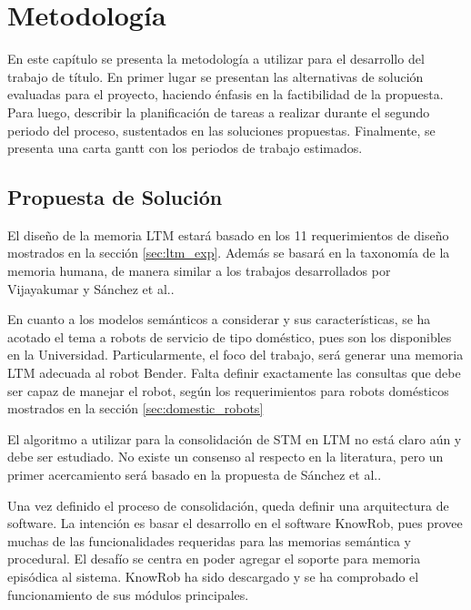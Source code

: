 
\chapter{Metodología}

En este capítulo se presenta la metodología a utilizar para el desarrollo del trabajo de título. En primer lugar se presentan las alternativas de solución evaluadas para el proyecto, haciendo énfasis en la factibilidad de la propuesta. Para luego, describir la planificación de tareas a realizar durante el segundo periodo del proceso, sustentados en las soluciones propuestas. Finalmente, se presenta una carta gantt con los periodos de trabajo estimados.


\section{Propuesta de Solución}

%


El diseño de la memoria LTM estará basado en los 11 requerimientos de diseño mostrados en la sección \ref{sec:ltm_exp}. Además se basará en la taxonomía de la memoria humana, de manera similar a los trabajos desarrollados por Vijayakumar\cite{Vijayakumar2014} y Sánchez et al.\cite{Sanchez:2015}.

En cuanto a los modelos semánticos a considerar y sus características, se ha acotado el tema a robots de servicio de tipo doméstico, pues son los disponibles en la Universidad. Particularmente, el foco del trabajo, será generar una memoria LTM adecuada al robot Bender. Falta definir exactamente las consultas que debe ser capaz de manejar el robot, según los requerimientos para robots domésticos mostrados en la sección \ref{sec:domestic_robots}

El algoritmo a utilizar para la consolidación de STM en LTM no está claro aún y debe ser estudiado. No existe un consenso al respecto en la literatura, pero un primer acercamiento será basado en la propuesta de Sánchez et al.\cite{Sanchez:2015}.

Una vez definido el proceso de consolidación, queda definir una arquitectura de software. La intención es basar el desarrollo en el software KnowRob, pues provee muchas de las funcionalidades requeridas para las memorias semántica y procedural. El desafío se centra en poder agregar el soporte para memoria episódica al sistema. KnowRob ha sido descargado y se ha comprobado el funcionamiento de sus módulos principales.

